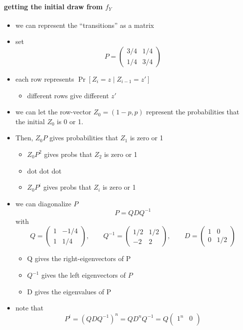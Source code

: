 \paragraph{getting the initial draw from $f_Y$}
\begin{itemize}
\item we can represent the ``transitions'' as a matrix
\item set \[P = \begin{pmatrix} 3/4 & 1/4 \\ 1/4 & 3/4 \end{pmatrix}\]
\item each row represents $\Pr[Z_i = z \mid Z_{i-1} = z']$
\begin{itemize}
\item different rows give different $z'$
\end{itemize}
\item we can let the row-vector $Z_0 = (1-p, p)$ represent the
  probabilities that the initial $Z_0$ is 0 or 1.
\item Then, $Z_0 P$ gives probabilities that $Z_1$ is zero or 1
\begin{itemize}
\item $Z_0 P^2$ gives probs that $Z_2$ is zero or 1
\item dot dot dot
\item $Z_0 P^i$ gives probs that $Z_i$ is zero or 1
\end{itemize}
\item we can diagonalize $P$
        \[P = Q D Q^{-1}\]
        with
        \[Q = \begin{pmatrix} 1 & -1/4 \\ 1 &
        1/4 \end{pmatrix},\qquad 
        Q^{-1} = \begin{pmatrix} 1/2 & 1/2 \\ -2 & 2 \end{pmatrix},
        \qquad 
        D = \begin{pmatrix} 1 & 0 \\ 0 & 1/2 \end{pmatrix}\]
\begin{itemize}
\item Q gives the right-eigenvectors of P
\item $Q^{-1}$ gives the left eigenvectors of $P$
\item D gives the eigenvalues of P
\end{itemize}
\item note that 
  \[P^i = (Q D Q^{-1})^n = Q D^n Q^{-1} = Q \begin{pmatrix} 1^n & 0 \\

\end{pmatrix}\]
\end{itemize}

